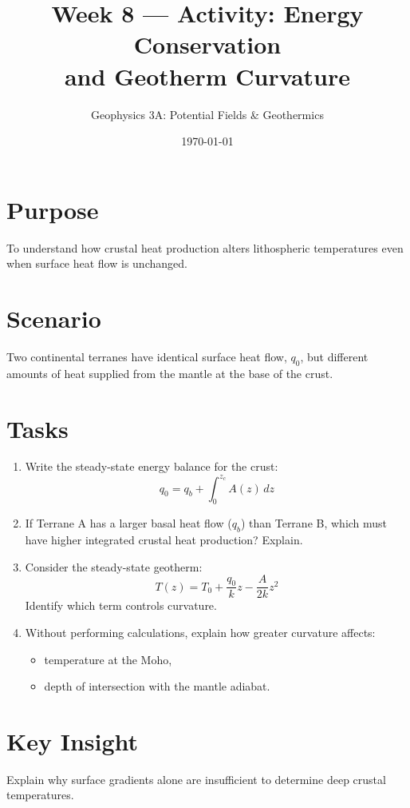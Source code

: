 \documentclass[11pt,a4paper]{article}
\title{Week 8 --- Activity: Energy Conservation \\ and Geotherm Curvature}
\author{Geophysics 3A: Potential Fields \& Geothermics}
\date{\today}
\begin{document}
\maketitle

\section*{Purpose}
To understand how crustal heat production alters lithospheric temperatures even when surface heat flow is unchanged.

\section*{Scenario}
Two continental terranes have identical surface heat flow, $q_0$, but different
amounts of heat supplied from the mantle at the base of the crust.

\section*{Tasks}
\begin{enumerate}
  \item Write the steady-state energy balance for the crust:
  \[
    q_0 = q_b + \int_0^{z_c} A(z)\,dz
  \]

  \item If Terrane A has a larger basal heat flow ($q_b$) than Terrane B, which must
  have higher integrated crustal heat production? Explain.

  \item Consider the steady-state geotherm:
  \[
    T(z) = T_0 + \frac{q_0}{k}z - \frac{A}{2k}z^2
  \]
  Identify which term controls curvature.

  \item Without performing calculations, explain how greater curvature affects:
  \begin{itemize}
    \item temperature at the Moho,
    \item depth of intersection with the mantle adiabat.
  \end{itemize}
\end{enumerate}

\section*{Key Insight}
Explain why surface gradients alone are insufficient to determine deep crustal
temperatures.
\end{document}
